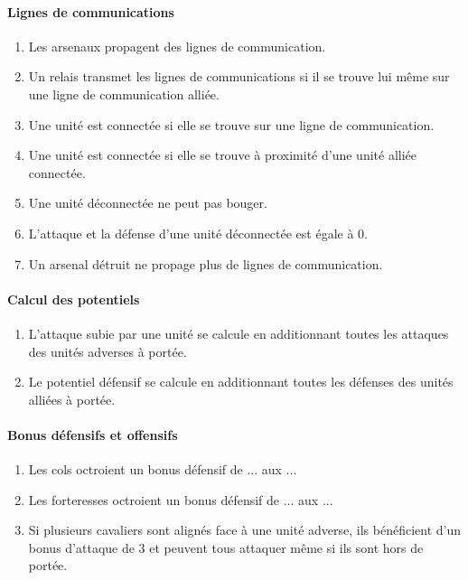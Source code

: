 \documentclass[12pt]{article}
\begin{document}
		\paragraph{Lignes de communications}
		\begin{enumerate}
		\item Les arsenaux propagent des lignes de communication.
		\item Un relais transmet les lignes de communications si il se trouve lui même sur une ligne de communication alliée.
		\item Une unité est connectée si elle se trouve sur une ligne de communication.
		\item Une unité est connectée si elle se trouve à proximité d'une unité alliée connectée.
		\item Une unité déconnectée ne peut pas bouger.
		\item L'attaque et la défense d'une unité déconnectée est égale à 0.
		\item Un arsenal détruit ne propage plus de lignes de communication.
		\end{enumerate}
		
		\paragraph{Calcul des potentiels}
		\begin{enumerate}
		\item L'attaque subie par une unité se calcule en additionnant toutes les attaques des unités adverses à portée.
		\item Le potentiel défensif se calcule en additionnant toutes les défenses des unités alliées à portée.
		\end{enumerate}
		
		\paragraph{Bonus défensifs et offensifs}
		\begin{enumerate}
		\item Les cols octroient un bonus défensif de ... aux ...
		\item Les forteresses octroient un bonus défensif de ... aux ...
		\item Si plusieurs cavaliers sont alignés face à une unité adverse, ils bénéficient d'un bonus d'attaque de 3 et peuvent tous attaquer même si ils sont hors de portée.
		\end{enumerate}
		
\end{document}
